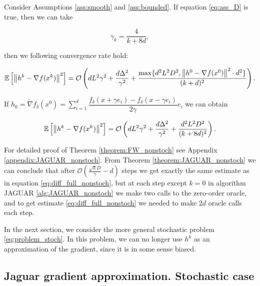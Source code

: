         \begin{theorem}
        \label{theorem:JAGUAR_nonstoch}
            Consider Assumptions \ref{ass:smooth} and \ref{ass:bounded}. If equation \eqref{eq:ass_D} is true, then we can take
            
            $$\gamma_k = \frac{4}{k + 8d},$$
            
            then we following convergence rate hold:

            \begin{equation*}
                \mathbb{E}\left[ \left\| h^{k} - \nabla f(x^{k}) \right\|^2 \right] = 
                \mathcal{O} \left( d L^2 \gamma^2 
                + \frac{d \Delta^2}{\gamma^2}
                +\frac{\max\{d^2 L^2 D^2, \left\| h^0 - \nabla f(x^0) \right\|^2 \cdot d^2\}}{(k + d)^2} \right).
            \end{equation*}

            If $h_0 = \widetilde{\nabla} f_\delta(x^0) = \sum_{i=1}^d \dfrac{f_{\delta}(x + \gamma e_i) - f_{\delta}(x - \gamma e_i)}{2 \gamma} e_i$ we can obtain 
    
            \begin{equation*}
                \mathbb{E}\left[ \left\| h^{k} - \nabla f(x^{k}) \right\|^2 \right] = 
                \mathcal{O} \left( d L^2 \gamma^2 
                + \frac{d \Delta^2}{\gamma^2}
                +\frac{d^2 L^2 D^2}{(k + 8d)^2} \right).
            \end{equation*}
        
        \end{theorem}
        
        For detailed proof of Theorem \ref{theorem:FW_nonstoch} see Appendix \ref{appendix:JAGUAR_nonstoch}. From Theorem \ref{theorem:JAGUAR_nonstoch} we can conclude that after $\mathcal{O}\left(\frac{\sqrt{d} D}{\gamma} - d\right)$ steps we get exactly the same estimate as in equation \eqref{eq:diff_full_nonstoch}, but at each step except $k=0$ in algorithm JAGUAR \ref{alg:JAGUAR_nonstoch} we make two calls to the zero-order oracle, and to get estimate \eqref{eq:diff_full_nonstoch} we needed to make $2d$ oracle calls each step.

        In the next section, we consider the more general stochastic problem \eqref{eq:problem_stoch}. In this problem, we can no longer use $h^k$ as an approximation of the gradient, since it is in some sense biased.

    \subsection{Jaguar gradient approximation. Stochastic case}
    \label{sect:JAGUAR_stoch}

